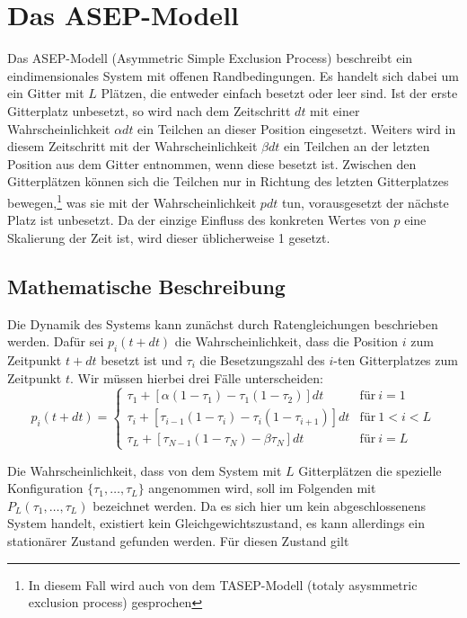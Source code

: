 \documentclass[10pt,a4paper]{report}
\begin{document}
\chapter{Das ASEP-Modell}
Das ASEP-Modell (Asymmetric Simple Exclusion Process) beschreibt ein eindimensionales System mit offenen Randbedingungen. Es handelt sich dabei um ein Gitter mit $L$ Plätzen, die entweder einfach besetzt oder leer sind. Ist der erste Gitterplatz unbesetzt, so wird nach dem Zeitschritt $dt$ mit einer Wahrscheinlichkeit $\alpha dt$ ein Teilchen an dieser Position eingesetzt. Weiters wird in diesem Zeitschritt mit der Wahrscheinlichkeit $\beta dt$ ein Teilchen an der letzten Position aus dem Gitter entnommen, wenn diese besetzt ist. Zwischen den Gitterplätzen können sich die Teilchen nur in Richtung des letzten Gitterplatzes bewegen,\footnote{In diesem Fall wird auch von dem TASEP-Modell (totaly asysmmetric exclusion process) gesprochen} was sie mit der Wahrscheinlichkeit $pdt$ tun, vorausgesetzt der nächste Platz ist unbesetzt. Da der einzige Einfluss des konkreten Wertes von $p$ eine Skalierung der Zeit ist, wird  dieser üblicherweise 1 gesetzt.\\

\section{Mathematische Beschreibung}
Die Dynamik des Systems kann zunächst durch Ratengleichungen beschrieben werden. Dafür sei $p_i(t+dt)$ die Wahrscheinlichkeit, dass die Position $i$ zum Zeitpunkt $t+dt$ besetzt ist und $\tau_i$ die Besetzungszahl des $i$-ten Gitterplatzes zum Zeitpunkt $t$. Wir müssen hierbei drei Fälle unterscheiden:
\begin{equation}\label{rate_equ}
p_i(t+dt)=
\begin{cases}
\tau_1+[\alpha(1-\tau_1)-\tau_1(1-\tau_2)]dt & \text{für}\ i=1\\
\tau_i+[\tau_{i-1}(1-\tau_i)-\tau_i(1-\tau_{i+1})]dt & \text{für}\ 1<i<L\\
\tau_L+[\tau_{N-1}(1-\tau_N)-\beta\tau_N]dt & \text{für}\ i=L
\end{cases}
\end{equation}

Die Wahrscheinlichkeit, dass von dem System mit $L$ Gitterplätzen die spezielle Konfiguration $\{ \tau_1,\ldots,\tau_L \}$ angenommen wird, soll im Folgenden mit $P_L(\tau_1,\ldots,\tau_L)$ bezeichnet werden. Da es sich hier um kein abgeschlossenens System handelt, existiert kein Gleichgewichtszustand, es kann allerdings ein stationärer Zustand gefunden werden. Für diesen Zustand gilt
\end{document}
